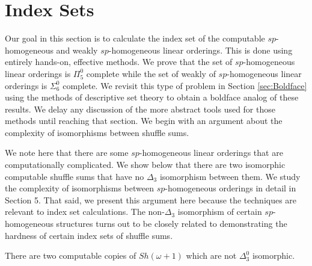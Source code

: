 \documentclass[11pt]{amsart}
\theoremstyle{definition}
\begin{document}
\section{Index Sets} \label{sec:index}

Our goal in this section is to calculate the index set of the computable $sp$-homogeneous and weakly $sp$-homogeneous linear orderings.
This is done using entirely hands-on, effective methods.
We prove that the set of $sp$-homogeneous linear orderings is $\Pi_5^0$ complete while the set of weakly of $sp$-homogeneous linear orderings is $\Sigma_6^0$ complete.
We revisit this type of problem in Section \ref{sec:Boldface} using the methods of descriptive set theory to obtain a boldface analog of these results.
We delay any discussion of the more abstract tools used for those methods until reaching that section.
We begin with an argument about the complexity of isomorphisms between shuffle sums.

We note here that there are some $sp$-homogeneous linear orderings that are computationally complicated.
We show below that there are two isomorphic computable shuffle sums that have no $\Delta_3$ isomorphism between them.
We study the complexity of isomorphisms between $sp$-homogeneous orderings in detail in Section 5.
That said, we present this argument here because the techniques are relevant to index set calculations.
The non-$\Delta_3$ isomorphism of certain $sp$-homogeneous structures turns out to be closely related to demonstrating the hardness of certain index sets of shuffle sums.

\begin{proposition} \label{shnotisom} 
There are two computable copies of $Sh(\omega + 1)$ which are not $\Delta^0_3$ isomorphic.
\end{proposition}
\end{document}
